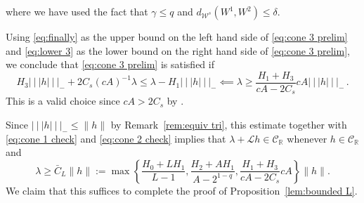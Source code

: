 \documentclass{amsart}
\numberwithin{equation}{section}
\newcommand\cC{{\mathcal C}}
\newcommand\cL{{\mathcal L}}
\newcommand\cW{{\mathcal W}}
\newcommand\bR{{\mathbb R}}
\newcommand{\tri}{{|\:\!\!|\:\!\!|}}
\begin{document}
where we have used the fact that $\gamma \le q$ and $d_{\cW^s}(W^1, W^2) \le \delta$.

Using \eqref{eq:finally} as the upper bound on the left hand side of \eqref{eq:cone 3 prelim} and \eqref{eq:lower 3}
as the lower bound on the right hand side of \eqref{eq:cone 3 prelim}, we conclude that \eqref{eq:cone 3 prelim}
is satisfied if
\[
H_3 \tri h \tri_- + 2C_s (cA)^{-1} \lambda \le \lambda - H_1 \tri h \tri_-
\impliedby \lambda \ge \frac{H_1 + H_3}{cA - 2C_s} cA \tri h \tri_- \, .
\]
This is a valid choice since $cA > 2C_s$ by \cite[eq.~(5.36)]{DL22}.

Since $\tri h \tri_- \le \| h \|$ by Remark~\ref{rem:equiv tri}, this estimate together with \eqref{eq:cone 1 check} 
and \eqref{eq:cone 2 check} implies that
$\lambda + \cL h \in \cC_{\bR}$ whenever $h \in \cC_{\bR}$ and 
\[
\lambda \ge \bar C_L \|h \| := \max \left\{ \frac{H_0 + LH_1}{L-1} , \frac{H_2 + AH_1}{A - 2^{1-q}}, \frac{H_1 + H_3}{cA - 2C_s} cA \right\} \| h \| .
\]
We claim that this suffices to complete the proof of Proposition~\ref{lem:bounded L}.
\end{document}
